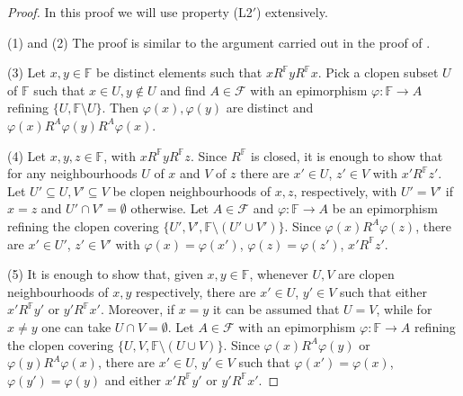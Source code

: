 \documentclass[12pt,twoside,a4paper]{amsart}
\theoremstyle{plain}
\theoremstyle{definition}
\begin{document}
\begin{proof}
In this proof we will use property (L2$'$) extensively.

(1) and (2)
The proof is similar to the argument carried out in the proof of \cite[lemma 4.1]{Irwin2006}.

(3) Let $x,y\in \mathbb F $ be distinct elements such that $xR^{ \mathbb F }yR^{ \mathbb F }x$.
Pick a clopen subset $U$ of $ \mathbb F $ such that $x\in U,y\notin U$ and find $A\in \mathcal F $ with an epimorphism $\varphi : \mathbb F \to A$ refining $\{ U, \mathbb F \setminus U\} $.
Then $\varphi (x),\varphi (y)$ are distinct and $\varphi (x)R^A\varphi (y)R^A\varphi (x)$.

(4)
Let $x,y,z\in \mathbb F $, with $xR^{ \mathbb F }yR^{ \mathbb F }z$.
Since $R^{ \mathbb F } $ is closed, it is enough to show that for any neighbourhoods $U$ of $x$ and $V$ of $z$ there are $x'\in U$, $z'\in V$ with $x'R^{ \mathbb F }z'$.
Let $U'\subseteq U,V'\subseteq V$ be clopen neighbourhoods of $x,z$, respectively, with $U'=V'$ if $x=z$ and $U'\cap V'=\emptyset $ otherwise.
Let $A\in \mathcal F$ and $\varphi : \mathbb F \to A$ be an epimorphism refining the clopen covering $\{ U',V', \mathbb F \setminus (U'\cup V')\} $.
Since $\varphi (x)R^A\varphi (z)$, there are $x'\in U'$, $z'\in V'$ with $\varphi (x)=\varphi (x')$, $\varphi (z)=\varphi (z')$, $x'R^{ \mathbb F }z'$.

(5)
It is enough to show that, given $x,y\in \mathbb F $, whenever $U,V$ are clopen neighbourhoods of $x,y$ respectively, there are $x'\in U$, $y'\in V$ such that either $x'R^{ \mathbb F }y'$ or $y'R^{ \mathbb F }x'$.
Moreover, if $x=y$ it can be assumed that $U=V$, while for $x\neq y$ one can take $U\cap V=\emptyset $.
Let $A\in \mathcal F $ with an epimorphism $\varphi : \mathbb F \to A$ refining the clopen covering $\{ U,V, \mathbb F \setminus (U\cup V)\} $.
Since $\varphi (x)R^A\varphi (y)$ or $\varphi (y)R^A\varphi (x)$, there are $x'\in U$, $y'\in V$ such that $\varphi (x')=\varphi (x)$, $\varphi (y')=\varphi (y)$ and either $x'R^{ \mathbb F }y'$ or $y'R^{ \mathbb F }x'$.


\end{proof}
\end{document}
